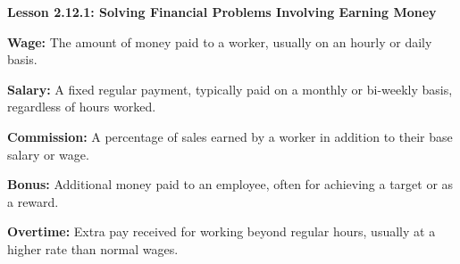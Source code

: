  \begin{center}
\textbf{Lesson 2.12.1: Solving Financial Problems Involving Earning Money}
\end{center}


    \textbf{Wage:} The amount of money paid to a worker, usually on an hourly or daily basis.
    
    \textbf{Salary:} A fixed regular payment, typically paid on a monthly or bi-weekly basis, regardless of hours worked.
    
    \textbf{Commission:} A percentage of sales earned by a worker in addition to their base salary or wage.
    
    \textbf{Bonus:} Additional money paid to an employee, often for achieving a target or as a reward.
    
    \textbf{Overtime:} Extra pay received for working beyond regular hours, usually at a higher rate than normal wages.

